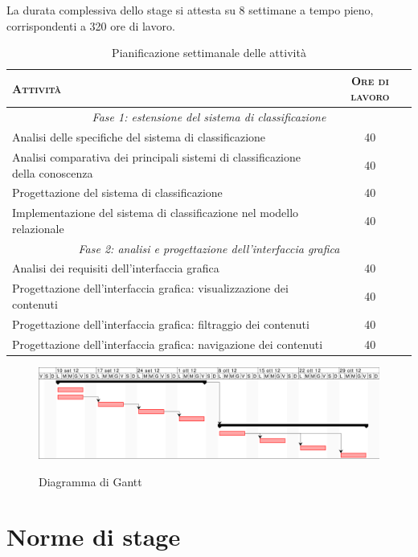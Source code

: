 La durata complessiva dello stage si attesta su 8 settimane a tempo pieno, corrispondenti a 320 ore di lavoro.

\begin{table}[ht]
\centering
\begin{tabular}{|p{10cm}|c|}
\hline
\textsc{Attività} & \textsc{Ore di lavoro} \\ \hline
\multicolumn{2}{|c|}{\textit{Fase 1: estensione del sistema di classificazione}} \\ \hline 
Analisi delle specifiche del sistema di classificazione & 40 \\ \hline
Analisi comparativa dei principali sistemi di classificazione della conoscenza & 40 \\ \hline
Progettazione del sistema di classificazione & 40 \\ \hline
Implementazione del sistema di classificazione nel modello relazionale & 40 \\ \hline
\multicolumn{2}{|c|}{\textit{Fase 2: analisi e progettazione dell'interfaccia grafica}} \\ \hline 
Analisi dei requisiti dell'interfaccia grafica & 40 \\ \hline
Progettazione dell'interfaccia grafica: visualizzazione dei contenuti & 40 \\ \hline
Progettazione dell'interfaccia grafica: filtraggio dei contenuti & 40 \\ \hline
Progettazione dell'interfaccia grafica: navigazione dei contenuti & 40 \\ \hline
\end{tabular}
\caption{Pianificazione settimanale delle attività}
\label{tab:tesi:stage:pianificazione}
\end{table}

\begin{figure}[ht]
\begin{center}
\includegraphics[width=14.5cm]{gantt.png}
\label{fig:tesi:stage:gantt}
\caption{Diagramma di Gantt}
\end{center}
\end{figure}

\section{Norme di stage}

